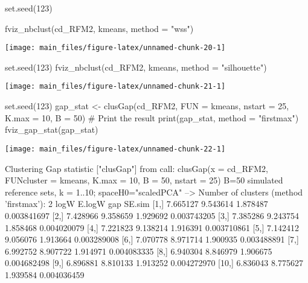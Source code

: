 \begin{Schunk}
\begin{Sinput}
set.seed(123)

fviz_nbclust(cd_RFM2, kmeans, method = "wss")
\end{Sinput}


\begin{center}\texttt{[image: main\_files/figure-latex/unnamed-chunk-20-1]} \end{center}

\end{Schunk}

\begin{Schunk}
\begin{Sinput}
set.seed(123)
fviz_nbclust(cd_RFM2, kmeans, method = "silhouette")
\end{Sinput}


\begin{center}\texttt{[image: main\_files/figure-latex/unnamed-chunk-21-1]} \end{center}

\end{Schunk}

\begin{Schunk}
\begin{Sinput}
set.seed(123)
gap_stat <- clusGap(cd_RFM2, FUN = kmeans, nstart = 25,
                    K.max = 10, B = 50)
# Print the result
print(gap_stat, method = "firstmax")
fviz_gap_stat(gap_stat)
\end{Sinput}


\begin{center}\texttt{[image: main\_files/figure-latex/unnamed-chunk-22-1]} \end{center}

\begin{Soutput}
Clustering Gap statistic ["clusGap"] from call:
clusGap(x = cd_RFM2, FUNcluster = kmeans, K.max = 10, B = 50,     nstart = 25)
B=50 simulated reference sets, k = 1..10; spaceH0="scaledPCA"
 --> Number of clusters (method 'firstmax'): 2
          logW   E.logW      gap      SE.sim
 [1,] 7.665127 9.543614 1.878487 0.003841697
 [2,] 7.428966 9.358659 1.929692 0.003743205
 [3,] 7.385286 9.243754 1.858468 0.004020079
 [4,] 7.221823 9.138214 1.916391 0.003710861
 [5,] 7.142412 9.056076 1.913664 0.003289008
 [6,] 7.070778 8.971714 1.900935 0.003488891
 [7,] 6.992752 8.907722 1.914971 0.004083335
 [8,] 6.940304 8.846979 1.906675 0.004682498
 [9,] 6.896881 8.810133 1.913252 0.004272970
[10,] 6.836043 8.775627 1.939584 0.004036459
\end{Soutput}
\end{Schunk}

